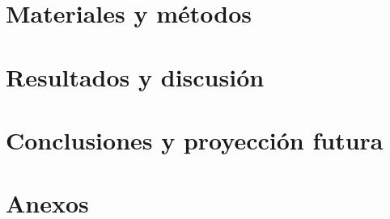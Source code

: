 \documentclass[twoside,spanish,a4paper,12pt]{tfg}
\makeatletter
\renewcommand*{\cleardoublepage}{\clearpage\if@twoside
  \ifodd\c@page\else\hbox{}\thispagestyle{empty}\newpage
  \if@twocolumn\hbox{}\newpage\fi\fi\fi}
\makeatother
\begin{document}
\chapter{Materiales y métodos}


\chapter{Resultados y discusión}


\chapter{Conclusiones y proyección futura}


\cleardoublepage
\pagestyle{appendix}

\appendix
\chapter{Anexos}


\cleardoublepage
{}
{}
\pagestyle{bibliografia}


\end{document}
